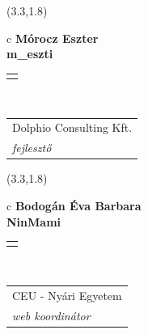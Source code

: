 \documentclass[11pt]{article}
\begin{document}
\makebox(3.3,1.8){
  \renewcommand\arraystretch{1.3}
  \begin{tabular}[c]{c}
    \hspace{8.5mm}
    \LARGE\bf{ Mórocz Eszter }\\
    \hspace{8.5mm}
    \Large{ m\_eszti }\\
    \renewcommand\arraystretch{3}
    \begin{tabular}[c]{c}
      \centering
      \fontfamily{phv}\selectfont{
        \textbf{
          \textsc{
            \scriptsize{
            \color{Dark}{ Ismerkedő }\color{Bright}{ Webmester }\color{Bright}{ Sminkmester }\color{Bright}{ Programozó }
            }
          }
        }
      }
    \end{tabular}
    \\
    \renewcommand\arraystretch{1}
    \begin{tabular}{p{3.3in}}
      \hspace{.7cm}Dolphio Consulting Kft.\\
      \hspace{.7cm}\emph{ fejlesztő }\\
    \end{tabular}
  \end{tabular}
}

\makebox(3.3,1.8){
  \renewcommand\arraystretch{1.3}
  \begin{tabular}[c]{c}
    \hspace{8.5mm}
    \LARGE\bf{ Bodogán Éva Barbara }\\
    \hspace{8.5mm}
    \Large{ NinMami }\\
    \renewcommand\arraystretch{3}
    \begin{tabular}[c]{c}
      \centering
      \fontfamily{phv}\selectfont{
        \textbf{
          \textsc{
            \scriptsize{
            \color{Dark}{ Ismerkedő }\color{Bright}{ Webmester }\color{Bright}{ Sminkmester }\color{Bright}{ Programozó }
            }
          }
        }
      }
    \end{tabular}
    \\
    \renewcommand\arraystretch{1}
    \begin{tabular}{p{3.3in}}
      \hspace{.7cm}CEU - Nyári Egyetem\\
      \hspace{.7cm}\emph{ web koordinátor }\\
    \end{tabular}
  \end{tabular}
}
\end{document}
